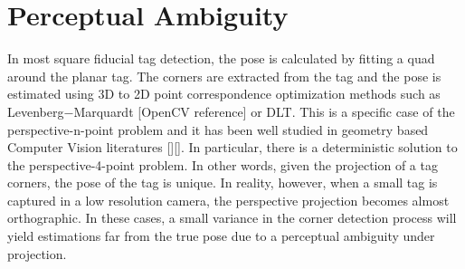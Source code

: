 \section{Perceptual Ambiguity}
\label{sec:problem}

In most square fiducial tag detection, the pose is calculated by fitting a quad around the planar tag. The corners are extracted from the tag and the pose is estimated using 3D to 2D point correspondence optimization methods such as Levenberg$-$Marquardt [OpenCV reference] or DLT. This is a specific case of the perspective-n-point problem and it has been well studied in geometry based Computer Vision literatures [][]. In particular, there is a deterministic solution to the perspective-4-point problem. In other words, given the projection of a tag corners, the pose of the tag is unique. In reality, however,  when a small tag is captured in a low resolution camera, the perspective projection becomes almost orthographic. In these cases, a small variance in the corner detection process will yield estimations far from the true pose due to a perceptual ambiguity under projection. 

